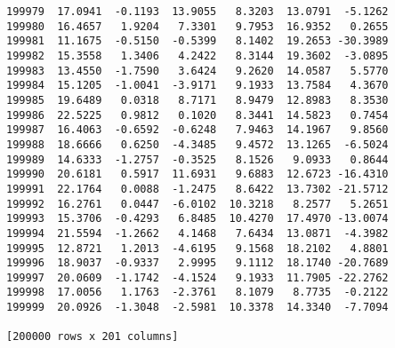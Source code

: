 \documentclass[11pt]{article}
\begin{document}
\begin{Verbatim}[commandchars=\\\{\}]
199979  17.0941  -0.1193  13.9055   8.3203  13.0791  -5.1262  
199980  16.4657   1.9204   7.3301   9.7953  16.9352   0.2655  
199981  11.1675  -0.5150  -0.5399   8.1402  19.2653 -30.3989  
199982  15.3558   1.3406   4.2422   8.3144  19.3602  -3.0895  
199983  13.4550  -1.7590   3.6424   9.2620  14.0587   5.5770  
199984  15.1205  -1.0041  -3.9171   9.1933  13.7584   4.3670  
199985  19.6489   0.0318   8.7171   8.9479  12.8983   8.3530  
199986  22.5225   0.9812   0.1020   8.3441  14.5823   0.7454  
199987  16.4063  -0.6592  -0.6248   7.9463  14.1967   9.8560  
199988  18.6666   0.6250  -4.3485   9.4572  13.1265  -6.5024  
199989  14.6333  -1.2757  -0.3525   8.1526   9.0933   0.8644  
199990  20.6181   0.5917  11.6931   9.6883  12.6723 -16.4310  
199991  22.1764   0.0088  -1.2475   8.6422  13.7302 -21.5712  
199992  16.2761   0.0447  -6.0102  10.3218   8.2577   5.2651  
199993  15.3706  -0.4293   6.8485  10.4270  17.4970 -13.0074  
199994  21.5594  -1.2662   4.1468   7.6434  13.0871  -4.3982  
199995  12.8721   1.2013  -4.6195   9.1568  18.2102   4.8801  
199996  18.9037  -0.9337   2.9995   9.1112  18.1740 -20.7689  
199997  20.0609  -1.1742  -4.1524   9.1933  11.7905 -22.2762  
199998  17.0056   1.1763  -2.3761   8.1079   8.7735  -0.2122  
199999  20.0926  -1.3048  -2.5981  10.3378  14.3340  -7.7094  

[200000 rows x 201 columns]

    \end{Verbatim}
\end{document}
